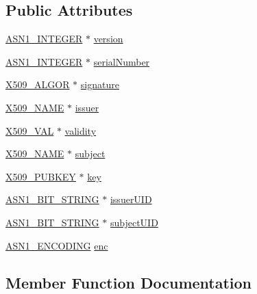 \subsection*{Public Attributes}
\begin{DoxyCompactItemize}
\item 
\hyperlink{ossl__typ_8h_af4335399bf9774cb410a5e93de65998b}{A\+S\+N1\+\_\+\+I\+N\+T\+E\+G\+ER} $\ast$ \hyperlink{structx509__cinf__st_a6376a52ce4df3f461bc4f16c27a38c64}{version}
\item 
\hyperlink{ossl__typ_8h_af4335399bf9774cb410a5e93de65998b}{A\+S\+N1\+\_\+\+I\+N\+T\+E\+G\+ER} $\ast$ \hyperlink{structx509__cinf__st_a53d185a4d78f4f99ec1d0de2915291e7}{serial\+Number}
\item 
\hyperlink{ossl__typ_8h_aa2b6185e6254f36f709cd6577fb5022e}{X509\+\_\+\+A\+L\+G\+OR} $\ast$ \hyperlink{structx509__cinf__st_a09006fd313228489ac13ebe6730c6362}{signature}
\item 
\hyperlink{ossl__typ_8h_a5c5fc036757e87b9bd163d0221696533}{X509\+\_\+\+N\+A\+ME} $\ast$ \hyperlink{structx509__cinf__st_aa9afd91f729b8e9859c84f2b65a747a3}{issuer}
\item 
\hyperlink{x509_8h_a870a329752479c6c758cc5a093c74604}{X509\+\_\+\+V\+AL} $\ast$ \hyperlink{structx509__cinf__st_ac808f4c20ecdf9bfae8656d205e8add1}{validity}
\item 
\hyperlink{ossl__typ_8h_a5c5fc036757e87b9bd163d0221696533}{X509\+\_\+\+N\+A\+ME} $\ast$ \hyperlink{structx509__cinf__st_acb4d49364d293a9f6166ce759965ac54}{subject}
\item 
\hyperlink{ossl__typ_8h_a9183376ae13a86ca35c75edf5412b914}{X509\+\_\+\+P\+U\+B\+K\+EY} $\ast$ \hyperlink{structx509__cinf__st_ad4ae834b88db41b67f7c54193267cd34}{key}
\item 
\hyperlink{ossl__typ_8h_af837aaa00e151b1e8773aea5a8fe1cc4}{A\+S\+N1\+\_\+\+B\+I\+T\+\_\+\+S\+T\+R\+I\+NG} $\ast$ \hyperlink{structx509__cinf__st_a39d82c3b8a147a5e8ed99ee24a79f791}{issuer\+U\+ID}
\item 
\hyperlink{ossl__typ_8h_af837aaa00e151b1e8773aea5a8fe1cc4}{A\+S\+N1\+\_\+\+B\+I\+T\+\_\+\+S\+T\+R\+I\+NG} $\ast$ \hyperlink{structx509__cinf__st_a5a8aba3df2b00582cee4b51ab9c9588a}{subject\+U\+ID}
\item 
\hyperlink{asn1_8h_ab4e998bfb21dbcf5af17f61035295946}{A\+S\+N1\+\_\+\+E\+N\+C\+O\+D\+I\+NG} \hyperlink{structx509__cinf__st_ad5373b5c6b59286b2c5c9166de0b5284}{enc}
\end{DoxyCompactItemize}


\subsection{Member Function Documentation}
